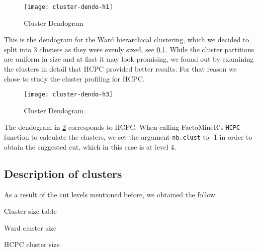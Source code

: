 
\begin{figure}[H]
    \centering
    \texttt{[image: cluster-dendo-h1]}
    \caption{Cluster Dendogram}%
    \label{fig:dendogram-h2}
\end{figure}

This is the dendogram for the Ward hierarchical clustering, which we decided to split into 3 clusters
as they were evenly sized, see \cref{sub:description_of_clusters}. While the cluster 
partitions are uniform in size and at first it may look promising, we found out by examining 
the clusters in detail that HCPC provided better results. For that reason we chose to study the
cluster profiling for HCPC.

\begin{landscape}

\begin{figure}[H]
    \centering
    \texttt{[image: cluster-dendo-h3]}
    \caption{Cluster Dendogram}%
    \label{fig:dendogram-final}
\end{figure}

\end{landscape}

The dendogram in \cref{fig:dendogram-final} corresponds to HCPC. When calling FactoMineR's \texttt{HCPC}
function to calculate the clusters, we set the argument \texttt{nb.clust} to -1 in order to obtain the
suggested cut, which in this case is at level 4.


\subsection{Description of clusters}%
\label{sub:description_of_clusters}

As a result of the cut levels mentioned before, we obtained the follow

\begin{table}[h!]
\vspace{5pt}
\caption{Cluster size table}%
\label{tab:cluster_size}
\centering
\begin{subtable}[t]{.3\textwidth}
    \centering
    \caption{Ward cluster size}
    
\end{subtable}
\begin{subtable}[t]{.3\textwidth}
    \centering
    \caption{HCPC cluster size}
    
\end{subtable}
\end{table}


